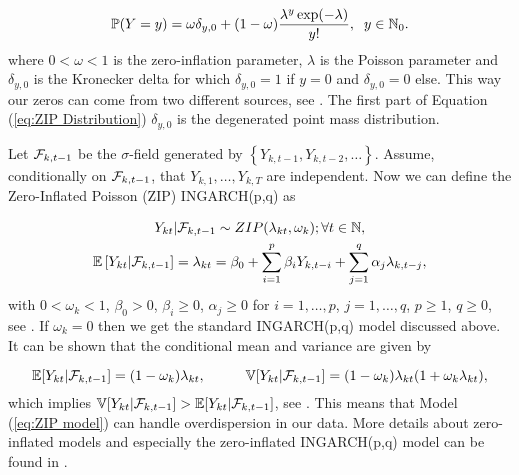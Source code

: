 \begin{equation}
\mathbb{P}(Y=y) = \omega \delta_{y,0}+ (1-\omega) \frac{\lambda^y \exp(-\lambda)}{y!}, \hspace{0.2cm} y \in \mathbb{N}_0.
\label{eq:ZIP Distribution}
\end{equation}
%
where $0 < \omega < 1$ is the zero-inflation parameter, $\lambda$ is the Poisson parameter and $\delta_{y,0}$ is the Kronecker delta for which $\delta_{y,0}=1$ if $y=0$ and $\delta_{y,0}=0$ else. This way our zeros can come from two different sources, see \textcite{Zhu:2012}. The first part of Equation (\ref{eq:ZIP Distribution}) $\delta_{y,0}$ is the degenerated point mass distribution.

Let $\mathcal{F}_{k,t-1}$ be the $\sigma$-field generated by $\left\{Y_{k,t-1},Y_{k,t-2},\ldots\right\}$. Assume, conditionally on $\mathcal{F}_{k,t-1}$, that $Y_{k,1},\ldots,Y_{k,T}$ are independent. Now we can define the Zero-Inflated Poisson (ZIP) INGARCH(p,q) as

\begin{equation}
\begin{gathered}
\label{eq:ZIP model}
Y_{kt} | \mathcal{F}_{k,t-1} \sim ZIP(\lambda_{kt},\omega_k); \forall t \in \mathbb{N}, \\
\mathbb{E}\left[Y_{kt} | \mathcal{F}_{k,t-1} \right] = \lambda_{kt} = \beta_0 + \sum_{i=1}^p\beta_i Y_{k,t-i} + \sum_{j=1}^q\alpha_j \lambda_{k,t-j},
\end{gathered}
\end{equation}
%
with $0<\omega_k<1$, $\beta_0>0$, $\beta_i\geq 0$, $\alpha_j \geq 0$ for $i=1,\ldots,p$, $j=1,\ldots,q$, $p\geq 1$, $q\geq 0$, see \textcite{Zhu:2012}. If $\omega_k =0$ then we get the standard INGARCH(p,q) model discussed above. It can be shown that the conditional mean and variance are given by

\begin{equation}
\mathbb{E}[Y_{kt} | \mathcal{F}_{k,t-1}] = (1-\omega_k)\lambda_{kt}, \hspace{1cm} \mathbb{V}[Y_{kt} | \mathcal{F}_{k,t-1}] =(1-\omega_k)\lambda_{kt}(1+\omega_k \lambda_{kt}),
\label{eq:Conditional Mean and Variance ZIP}
\end{equation}
%
which implies $ \mathbb{V}[Y_{kt} | \mathcal{F}_{k,t-1}] > \mathbb{E}[Y_{kt} | \mathcal{F}_{k,t-1}]$, see \textcite{Zhu:2012}. This means that Model (\ref{eq:ZIP model}) can handle overdispersion in our data. More details about zero-inflated models and especially the zero-inflated INGARCH(p,q) model can be found in \textcite{Zhu:2012}.

